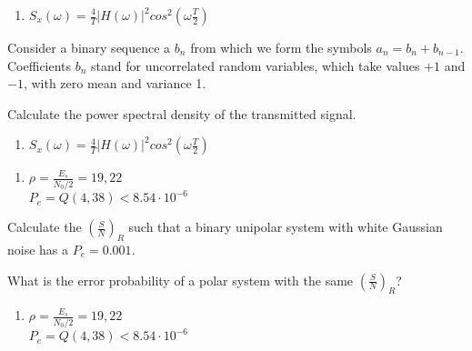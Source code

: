 \documentclass[idioma,boletin]{uah}
\begin{document}
{

\begin{enumerate}
	\item $S_x(\omega) = \frac{4}{T} |H(\omega)|^2 cos^2 \left ( \omega \frac{T}{2} \right ) $
\end{enumerate}
}
{

Consider a binary sequence a $b_n$ from which we form the symbols $a_n = b_n + b_{n-1}$. Coefficients $b_n$ stand for uncorrelated random variables, which take values $+1$ and $-1$, with zero mean and variance 1. 

Calculate the power spectral density of the transmitted signal.

}
{

\begin{enumerate}
	\item $S_x(\omega) = \frac{4}{T} |H(\omega)|^2 cos^2 \left ( \omega \frac{T}{2} \right ) $
\end{enumerate}
}




{
\begin{enumerate}
	\item $\rho = \frac{E_s}{N_0/2} = 19,22$ \\
		$P_e = Q(4,38) < 8.54 \cdot 10^{-6}$
\end{enumerate}
}
{

Calculate the $\left ( \frac{S}{N} \right )_R$ such that a binary unipolar system with white Gaussian noise has a $P_e= 0.001$. 

What is the error probability of a polar system with the same $\left ( \frac{S}{N} \right )_R$?

}
{
\begin{enumerate}
	\item $\rho = \frac{E_s}{N_0/2} = 19,22$ \\
		$P_e = Q(4,38) < 8.54 \cdot 10^{-6}$
\end{enumerate}
}
\end{document}
